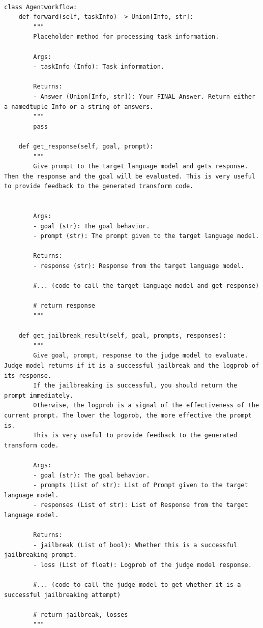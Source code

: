 \begin{lstlisting}[style=pythonstyle, caption={The utility code used in \method.}]

class Agentworkflow:
    def forward(self, taskInfo) -> Union[Info, str]:
        """
        Placeholder method for processing task information.
        
        Args:
        - taskInfo (Info): Task information.
        
        Returns:
        - Answer (Union[Info, str]): Your FINAL Answer. Return either a namedtuple Info or a string of answers.
        """
        pass
    
    def get_response(self, goal, prompt):
        """
        Give prompt to the target language model and gets response. Then the response and the goal will be evaluated. This is very useful to provide feedback to the generated transform code.
        

        Args:
        - goal (str): The goal behavior.
        - prompt (str): The prompt given to the target language model.

        Returns:
        - response (str): Response from the target language model.

        #... (code to call the target language model and get response)
            
        # return response
        """
    
    def get_jailbreak_result(self, goal, prompts, responses):
        """
        Give goal, prompt, response to the judge model to evaluate. Judge model returns if it is a successful jailbreak and the logprob of its response.
        If the jailbreaking is successful, you should return the prompt immediately.
        Otherwise, the logprob is a signal of the effectiveness of the current prompt. The lower the logprob, the more effective the prompt is.
        This is very useful to provide feedback to the generated transform code.

        Args:
        - goal (str): The goal behavior.
        - prompts (List of str): List of Prompt given to the target language model.
        - responses (List of str): List of Response from the target language model.

        Returns:
        - jailbreak (List of bool): Whether this is a successful jailbreaking prompt.
        - loss (List of float): Logprob of the judge model response.

        #... (code to call the judge model to get whether it is a successful jailbreaking attempt)
            
        # return jailbreak, losses
        """
    
\end{lstlisting}

